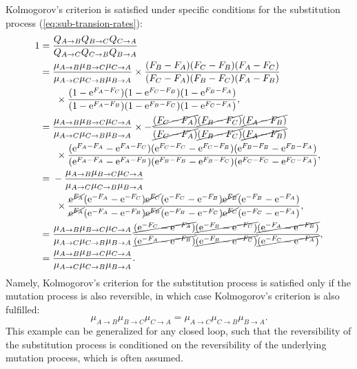 Kolmogorov's criterion is satisfied under specific conditions for the substitution process (\ref{eq:sub-transion-rates}):
\begin{align}
1 ={}& \dfrac{Q_{A \to B}Q_{B \to C}Q_{C \to A}}{Q_{A \to C}Q_{C \to B}Q_{B \to A}}\\
  ={}& \dfrac{\mu_{A \to B}\mu_{B \to C}\mu_{C \to A}}{\mu_{A \to C}\mu_{C \to B}\mu_{B \to A}} \times \dfrac{(F_{B} - F_{A})(F_{C} - F_{B})(F_{A} - F_{C})}{(F_{C} - F_{A})(F_{B} - F_{C})(F_{A} - F_{B})} \notag \\
     &\ \times \dfrac{( 1 - \text{e}^{F_{A} - F_{C}} )( 1 - \text{e}^{F_{C} - F_{B}} )( 1 - \text{e}^{F_{B} - F_{A}} )}{( 1 - \text{e}^{F_{A} - F_{B}} )( 1 - \text{e}^{F_{B} - F_{C}} )( 1 - \text{e}^{F_{C} - F_{A}} )}, \\
  ={}& \dfrac{\mu_{A \to B}\mu_{B \to C}\mu_{C \to A}}{\mu_{A \to C}\mu_{C \to B}\mu_{B \to A}} \times -\dfrac{\cancel{(F_{C} - F_{A})}\cancel{(F_{B} - F_{C})}\cancel{(F_{A} - F_{B})}}{\cancel{(F_{C} - F_{A})}\cancel{(F_{B} - F_{C})}\cancel{(F_{A} - F_{B})}} \notag \\
     &\ \times \dfrac{( \text{e}^{F_{A} - F_{A}} - \text{e}^{F_{A} - F_{C}} )( \text{e}^{F_{C} - F_{C}} - \text{e}^{F_{C} - F_{B}} )( \text{e}^{F_{B} - F_{B}} - \text{e}^{F_{B} - F_{A}} )}{( \text{e}^{F_{A} - F_{A}} - \text{e}^{F_{A} - F_{B}} )( \text{e}^{F_{B} - F_{B}} - \text{e}^{F_{B} - F_{C}} )( \text{e}^{F_{C} - F_{C}} - \text{e}^{F_{C} - F_{A}} )}, \\
  ={}& - \dfrac{\mu_{A \to B}\mu_{B \to C}\mu_{C \to A}}{\mu_{A \to C}\mu_{C \to B}\mu_{B \to A}} \notag \\
     &\ \times \dfrac{\cancel{\text{e}^{F_{A}}}( \text{e}^{-F_{A}} - \text{e}^{ - F_{C}} )\cancel{\text{e}^{F_{C}}}( \text{e}^{-F_{C}} - \text{e}^{ - F_{B}} )\cancel{\text{e}^{F_{B}}}( \text{e}^{-F_{B}} - \text{e}^{ - F_{A}} )}{\cancel{\text{e}^{F_{A}}}( \text{e}^{-F_{A}} - \text{e}^{ - F_{B}} )\cancel{\text{e}^{F_{B}}}( \text{e}^{-F_{B}} - \text{e}^{ - F_{C}} )\cancel{\text{e}^{F_{C}}}( \text{e}^{-F_{C}} - \text{e}^{ - F_{A}} )}, \\
  ={}& \dfrac{\mu_{A \to B}\mu_{B \to C}\mu_{C \to A}}{\mu_{A \to C}\mu_{C \to B}\mu_{B \to A}} \dfrac{\cancel{( \text{e}^{-F_{C}} - \text{e}^{ - F_{A}} )}\cancel{( \text{e}^{-F_{B}} - \text{e}^{ - F_{C}} )}\cancel{( \text{e}^{-F_{A}} - \text{e}^{ - F_{B}} )}}{\cancel{( \text{e}^{-F_{A}} - \text{e}^{ - F_{B}} )}\cancel{( \text{e}^{-F_{B}} - \text{e}^{ - F_{C}} )}\cancel{( \text{e}^{-F_{C}} - \text{e}^{ - F_{A}} )}}, \\
  ={}& \dfrac{\mu_{A \to B}\mu_{B \to C}\mu_{C \to A}}{\mu_{A \to C}\mu_{C \to B}\mu_{B \to A}}.
\end{align}
Namely, Kolmogorov's criterion for the substitution process is satisfied only if the mutation process is also reversible, in which case Kolmogorov's criterion is also fulfilled:
\begin{equation}
    \mu_{A \to B}\mu_{B \to C}\mu_{C \to A}=\mu_{A \to C}\mu_{C \to B}\mu_{B \to A}.
\end{equation}
This example can be generalized for any closed loop, such that the reversibility of the substitution process is conditioned on the reversibility of the underlying mutation process, which is often assumed.

